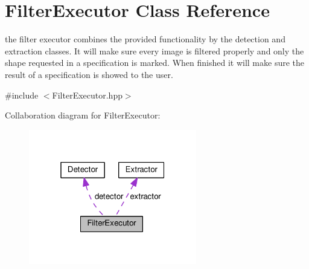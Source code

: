 \hypertarget{classFilterExecutor}{}\section{Filter\+Executor Class Reference}
\label{classFilterExecutor}


the filter executor combines the provided functionality by the detection and extraction classes. It will make sure every image is filtered properly and only the shape requested in a specification is marked. When finished it will make sure the result of a specification is showed to the user.  




{\ttfamily \#include $<$Filter\+Executor.\+hpp$>$}



Collaboration diagram for Filter\+Executor\+:\nopagebreak
\begin{figure}[H]
\begin{center}
\leavevmode
\includegraphics[width=208pt]{classFilterExecutor__coll__graph}
\end{center}
\end{figure}
